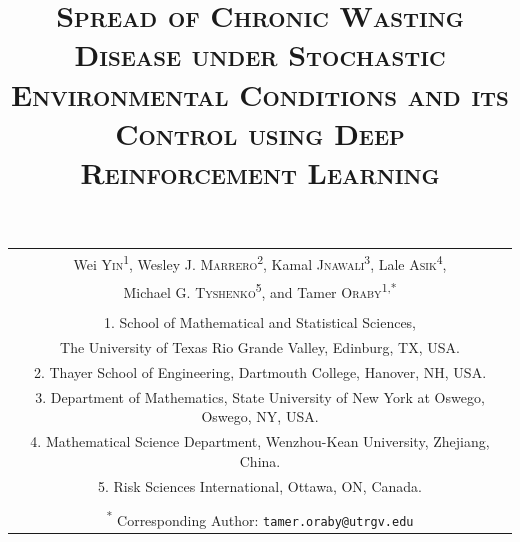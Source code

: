 \documentclass[12pt,a4paper,reqno]{amsart}
\title{\large\scshape Spread of Chronic Wasting Disease under Stochastic Environmental Conditions and its Control using Deep Reinforcement Learning}
\date{}
\theoremstyle{definition}
\theoremstyle{remark}
\theoremstyle{plain}
\begin{document}
\maketitle




{%
\begin{tabular}{@{}c@{}}
Wei {\scshape Yin}\textsuperscript{1}, Wesley J. {\scshape Marrero}\textsuperscript{2},
Kamal {\scshape Jnawali}\textsuperscript{3},
Lale {\scshape Asik}\textsuperscript{4},\\
Michael G.  {\scshape Tyshenko}\textsuperscript{5}, and Tamer {\scshape Oraby}\textsuperscript{1,*}\\
\\
1. School of Mathematical and Statistical Sciences, \\ The University of Texas Rio Grande Valley, Edinburg, TX, USA. \\
2. Thayer School of Engineering, Dartmouth College, Hanover, NH, USA.\\
3. Department of Mathematics, State University of New York at Oswego, Oswego, NY, USA.\\
4. Mathematical Science Department, Wenzhou-Kean University, Zhejiang, China.  \\
5.  Risk Sciences International, Ottawa, ON, Canada.\\
\\
{}\textsuperscript{*} Corresponding Author: \texttt{tamer.oraby@utrgv.edu}
\\
\end{tabular}\par\bigskip}


\end{document}
